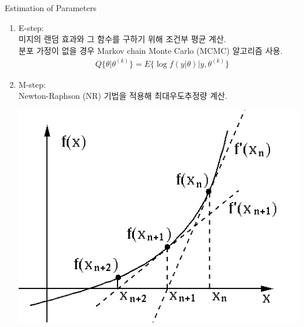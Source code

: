 \documentclass[9pt, xelatex]{beamer}
\begin{document}
{\begin{frame}[allowframebreaks]{Estimation of Parameters}
		\begin{enumerate}
			\item E-step: \\
				미지의 랜덤 효과와 그 함수를 구하기 위해 조건부 평균 계산.\\
				분포 가정이 없을 경우 Markov chain Monte Carlo (MCMC) 알고리즘 사용. 				
				\begin{align*}
					& Q\{\theta \vert \theta^{(k)} \} = E\{ \log f(y\vert\theta) \vert y, \theta^{(k)}\}
				\end{align*}
			\item M-step: \\
				Newton-Raphson (NR) 기법을 적용해 최대우도추정량 계산.
				\begin{center}
					\includegraphics[scale=0.2]{nr.png}
				\end{center}
		\end{enumerate}
		
	\end{frame}
}
\end{document}
